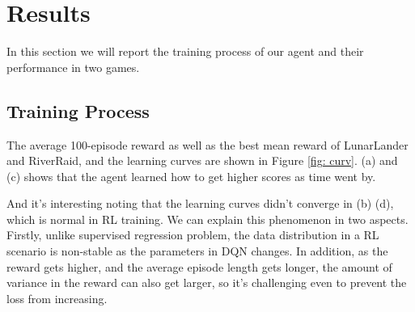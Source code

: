 \documentclass[12pt]{article}
\begin{document}
\section{Results}
In this section we will report the training process of our agent and their performance in two games. 

\subsection{Training Process}
The average 100-episode reward as well as the best mean reward of LunarLander and RiverRaid, and the learning curves are shown in Figure \ref{fig: curv}. (a) and (c) shows that the agent learned how to get higher scores as time went by.

And it's interesting noting that the learning curves didn't converge in (b) (d), which is normal in RL training. We can explain this phenomenon in two aspects. Firstly, unlike supervised regression problem, the data distribution in a RL scenario is non-stable as the parameters in DQN changes. In addition, as the reward gets higher, and the average episode length gets longer, the amount of variance in the reward can also get larger, so it's challenging even to prevent the loss from increasing.
\end{document}

